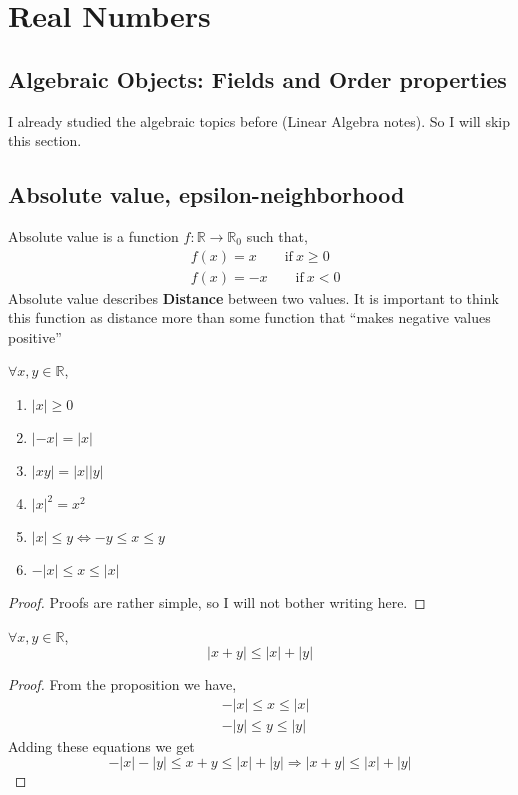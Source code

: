 \chapter{Real Numbers}
\section{Algebraic Objects: Fields and Order properties}
I already studied the algebraic topics before (Linear Algebra notes). So I will skip this section.
\section{Absolute value, epsilon-neighborhood}
Absolute value is a function $f: \mathbb{R} \rightarrow \mathbb{R}_0$ such that,
\begin{align*}
    &f(x) = x \qquad \text{if} \ x \ge 0 \\
    &f(x) = -x \qquad \text{if} \ x < 0
\end{align*}
Absolute value describes \textbf{Distance} between two values. It is important to think this function as distance more than some function that ``makes negative values positive''
\begin{proposition} $\forall x,y \in \mathbb{R}$,
    \begin{enumerate}
        \item $ |x| \ge 0$
        \item $|-x| = |x|$
        \item $|xy| =|x||y|$
        \item $|x|^2= x^2$
        \item $|x| \le y \iff -y \le x \le y$
        \item $-|x| \le x \le |x|$
    \end{enumerate}
    \begin{proof}
        Proofs are rather simple, so I will not bother writing here.
    \end{proof}
\end{proposition}
\begin{theorem} $\forall x,y \in \mathbb{R}$,
    \[ |x+y| \le |x| + |y| \]
    \begin{proof}
        From the proposition we have,
        \begin{align*}
            &-|x| \le x  \le |x| \\
            &-|y| \le y \le |y|
        \end{align*}
        Adding these equations we get
        \[  -|x| -|y| \le x+y \le |x| +|y| \Rightarrow |x+y| \le |x| + |y|\]
    \end{proof}
\end{theorem}
